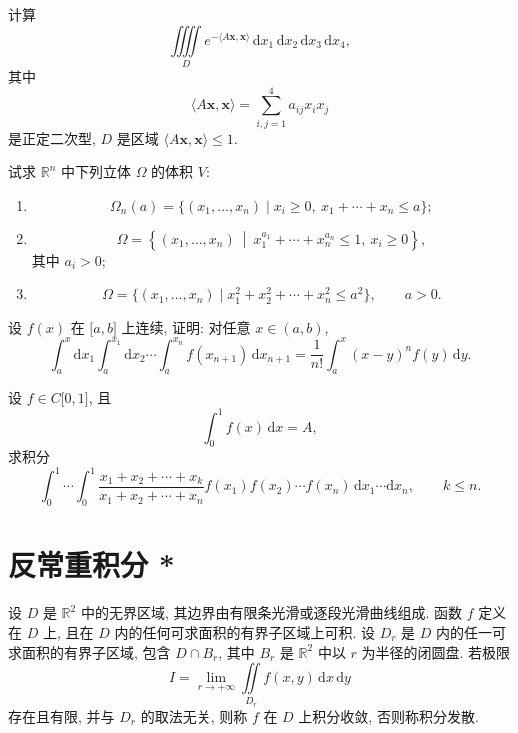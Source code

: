 \documentclass[../../数学分析培优讲义.tex]{subfiles}
\begin{document}
\begin{example}
计算
\[
    \iiiint\limits_De^{-\langle A\bm{x},\bm{x}\rangle}\,
    \mathrm{d}x_1\,\mathrm{d}x_2\,\mathrm{d}x_3\,\mathrm{d}x_4,
\]
其中
\[
    \langle A\bm{x},\bm{x}\rangle=\sum\limits_{i,j=1}^4a_{ij}x_ix_j
\]
是正定二次型, $D$ 是区域 $\langle A\bm{x},\bm{x}\rangle\leq1$.
\end{example}
\exampleblank

\begin{example}
试求 $\mathbb{R}^n$ 中下列立体 $\Omega$ 的体积 $V$:
\begin{enumerate}[label=(\arabic*)]
    \item
    \[
        \Omega_n(a)=\{(x_1,\ldots,x_n)\mid x_i\geq0,\ x_1+\cdots+x_n\leq a\};
    \]
    \item
    \[
        \Omega=\left\{(x_1,\ldots,x_n)\ \middle|\ x_1^{a_1}+\cdots+x_n^{a_n}\leq1,\ x_i\geq0\right\},
    \]
    其中 $a_i>0$;
    \item
    \[
        \Omega=\{(x_1,\ldots,x_n)\mid x_1^2+x_2^2+\cdots+x_n^2\leq a^2\},\qquad a>0.
    \]
\end{enumerate}
\end{example}
\exampleblank

\begin{example}
设 $f(x)$ 在 $\lbrack a,b\rbrack$ 上连续, 证明: 对任意 $x\in(a,b)$,
\[
    \int_a^x\mathrm{d}x_1\int_a^{x_1}\mathrm{d}x_2\cdots\int_a^{x_n}f(x_{n+1})\,\mathrm{d}x_{n+1}
    =\dfrac{1}{n!}\int_a^x(x-y)^nf(y)\,\mathrm{d}y.
\]
\end{example}
\exampleblank

\begin{example}
设 $f\in C\lbrack0,1\rbrack$, 且
\[
    \int_0^1f(x)\,\mathrm{d}x=A,
\]
求积分
\[
    \int_0^1\cdots\int_0^1
    \dfrac{x_1+x_2+\cdots+x_k}{x_1+x_2+\cdots+x_n}
    f(x_1)f(x_2)\cdots f(x_n)
    \,\mathrm{d}x_1\cdots\mathrm{d}x_n,
    \qquad k\leq n.
\]
\end{example}
\exampleblank


\newpage

\section{反常重积分 *}

\begin{definition}[无界区域]
设 $D$ 是 $\mathbb{R}^2$ 中的无界区域, 其边界由有限条光滑或逐段光滑曲线组成. 函数 $f$ 定义在 $D$ 上, 且在 $D$ 内的任何可求面积的有界子区域上可积. 设 $D_r$ 是 $D$ 内的任一可求面积的有界子区域, 包含 $D\cap B_r$, 其中 $B_r$ 是 $\mathbb{R}^2$ 中以 $r$ 为半径的闭圆盘. 若极限
\[
    I=\lim\limits_{r\to+\infty}\iint\limits_{D_r}f(x,y)\,\mathrm{d}x\,\mathrm{d}y
\]
存在且有限, 并与 $D_r$ 的取法无关, 则称 $f$ 在 $D$ 上积分收敛, 否则称积分发散.
\end{definition}
\end{document}
